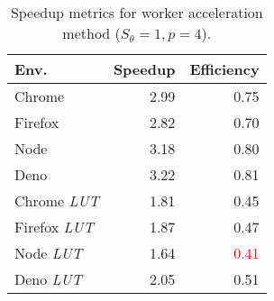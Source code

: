 \begin{wraptable}{r}{6cm}
    \caption{Speedup metrics for worker acceleration method ($S_\theta = 1, p = 4$).}
    \label{tab:worker_speedup}
    \setlength{\tabcolsep}{0.5em}
    \begin{tabular}{lrr}%
        \hline
        Env.                 & Speedup & Efficiency                       \\
        \hline
        Chrome               & 2.99    & 0.75                             \\
        Firefox              & 2.82    & 0.70                             \\
        Node                 & 3.18    & \textcolor{green!70!black}{0.80} \\
        Deno                 & 3.22    & \textcolor{green!70!black}{0.81}            \\
        Chrome \textit{LUT}  & 1.81    & 0.45                             \\
        Firefox \textit{LUT} & 1.87    & 0.47                             \\
        Node \textit{LUT}    & 1.64    & \textcolor{red}{0.41}                             \\
        Deno \textit{LUT}    & 2.05    & 0.51            \\
        \hline
    \end{tabular}
\end{wraptable}
